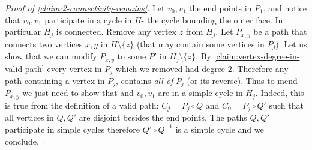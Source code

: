 \documentclass[10pt,a4paper]{article}
\newcommand{\prettyref}[1]{\cref{#1}}
\theoremstyle{definition}
\theoremstyle{remark}
\newcommand{\set}[1]{\{#1\}}
\numberwithin{equation}{section}
\let\pref=\prettyref
\begin{document}
\begin{proof}[Proof of \pref{claim:2-connectivity-remains}]
% 
    Let \(v_0,v_1\) the end points in \(P_1\), and notice that \(v_0,v_1\) participate in a cycle in \(H\)- the cycle bounding the outer face. In particular \(H_j\) is connected. Remove any vertex \(z\) from \(H_j\). Let \(P_{x,y}\) be a path that connects two vertices \(x,y\) in \(H \setminus \set{z}\) (that may contain some vertices in \(P_j\)). Let us show that we can modify \(P_{x,y}\) to some \(P'\) in \(H_j \setminus \set{z}\). By \pref{claim:vertex-degree-in-valid-path} every vertex in \(P_j\) which we removed had degree \(2\). Therefore any path containing a vertex in \(P_j\), contains \emph{all of} \(P_j\) (or its reverse). Thus to mend \(P_{x,y}\) we just need to show that and \(v_0,v_1\) are in a simple cycle in \(H_j\). Indeed, this is true from the definition of a valid path: \(C_j = P_j \circ Q\) and \(C_0 = P_j \circ Q'\) such that all vertices in \(Q,Q'\) are disjoint besides the end points. The paths \(Q,Q'\) participate in simple cycles therefore \(Q' \circ Q^{-1}\) is a simple cycle and we conclude.
\end{proof}
\end{document}
